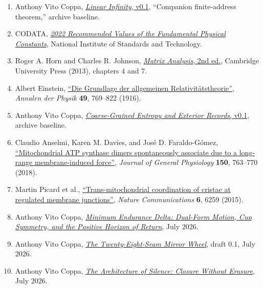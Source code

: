 \begin{enumerate}
\item
  Anthony Vito Coppa, \href{https://github.com/Coppalini-Architecture/coppalini-architecture/blob/9b7122ca5c3712c2c294e2bc5097276d0ba9817b/papers/LINEAR_INFINITY_CANONICAL_v0_1.pdf}{\emph{Linear Infinity}, v0.1}, ``Companion finite-address theorem,'' archive baseline.
\item
  CODATA, \href{https://physics.nist.gov/cuu/pdf/JPCRD2022CODATA.pdf}{\emph{2022 Recommended Values of the Fundamental Physical Constants}}, National Institute of Standards and Technology.
\item
  Roger A. Horn and Charles R. Johnson, \href{https://www.cambridge.org/highereducation/books/matrix-analysis/FDA3627DC2B9F5C3DF2FD8C3CC136B48}{\emph{Matrix Analysis}, 2nd ed.}, Cambridge University Press (2013), chapters 4 and 7.
\item
  Albert Einstein, \href{https://doi.org/10.1002/andp.19163540702}{``Die Grundlage der allgemeinen Relativitätstheorie''}, \emph{Annalen der Physik} \textbf{49}, 769--822 (1916).
\item
  Anthony Vito Coppa, \href{https://github.com/Coppalini-Architecture/coppalini-architecture/blob/9b7122ca5c3712c2c294e2bc5097276d0ba9817b/papers/coarse-grained-entropy-and-exterior-records/coarse-grained-entropy-and-exterior-records-v0.1.pdf}{\emph{Coarse-Grained Entropy and Exterior Records}, v0.1}, archive baseline.
\item
  Claudio Anselmi, Karen M. Davies, and José D. Faraldo-Gómez, \href{https://doi.org/10.1085/jgp.201812033}{``Mitochondrial ATP synthase dimers spontaneously associate due to a long-range membrane-induced force''}, \emph{Journal of General Physiology} \textbf{150}, 763--770 (2018).
\item
  Martin Picard et al., \href{https://doi.org/10.1038/ncomms7259}{``Trans-mitochondrial coordination of cristae at regulated membrane junctions''}, \emph{Nature Communications} \textbf{6}, 6259 (2015).
\item
  Anthony Vito Coppa, \href{https://chatgpt.com/library?file_id=libfile_d247e341311c8191bb1c0aefc5af4111\&account_id=personal}{\emph{Minimum Endurance Delta: Dual-Form Motion, Cup Symmetry, and the Positive Horizon of Return}}, July 2026.
\item
  Anthony Vito Coppa, \href{https://chatgpt.com/library?file_id=libfile_7054d1b4713481918550a4bf9ef72320\&account_id=personal}{\emph{The Twenty-Eight-Seam Mirror Wheel}}, draft 0.1, July 2026.
\item
  Anthony Vito Coppa, \href{https://chatgpt.com/library?file_id=libfile_5167b051c248819185f3673cbcb6537d\&account_id=personal}{\emph{The Architecture of Silence: Closure Without Erasure}}, July 2026.

\end{enumerate}
